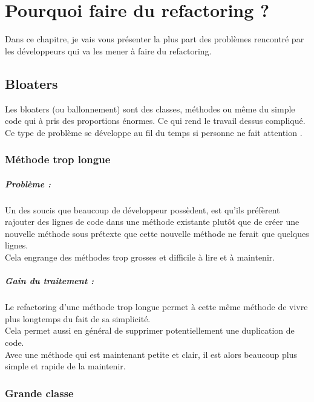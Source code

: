 \documentclass[a4paper,twoside,12pt,openright]{report}
\begin{document}
\chapter{Pourquoi faire du refactoring ?}
Dans ce chapitre, je vais vous présenter la plus part des problèmes rencontré par les développeurs qui va les mener à faire du refactoring.\\


\section{Bloaters}
Les bloaters (ou ballonnement) sont des classes, méthodes ou même du simple code qui à pris des proportions énormes. Ce qui rend le travail dessus compliqué. Ce type de problème se développe au fil du temps si personne ne fait attention .\\

\subsection{Méthode trop longue}
\paragraph{Problème :}
Un des soucis que beaucoup de développeur possèdent, est qu'ils préfèrent rajouter des lignes de code dans une méthode existante plutôt que de créer une nouvelle méthode sous prétexte que cette nouvelle méthode ne ferait que quelques lignes.\\
Cela engrange des méthodes trop grosses et difficile à lire et à maintenir.\\

\paragraph{Gain du traitement :}
Le refactoring d'une méthode trop longue permet à cette même méthode de vivre plus longtemps du fait de sa simplicité.\\
Cela permet aussi en général de supprimer potentiellement une duplication de code.\\
Avec une méthode qui est maintenant petite et clair, il est alors beaucoup plus simple et rapide de la maintenir.\\

\subsection{Grande classe}
\end{document}
